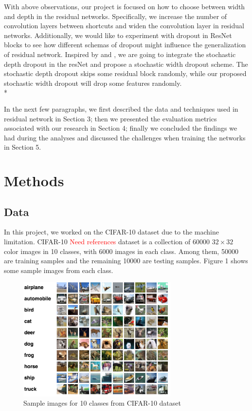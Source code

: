 \documentclass{article} %
\begin{document}
With above observations, our project is focused on how to choose between width and depth in the residual networks. Specifically, we increase the number of convolution layers between shortcuts and widen the convolution layer in residual networks. Additionally, we would like to experiment with dropout in ResNet blocks to see how different schemas of dropout might influence the generalization of residual network. Inspired by \cite{he2016identity} and \cite{DBLP:journals/corr/HuangSLSW16}, we are going to integrate the stochastic depth dropout in the resNet and propose a stochastic width dropout scheme. The stochastic depth dropout skips some residual block randomly, while our proposed stochastic width dropout will drop some features randomly. \\*

In the next few paragraphs, we first described the data and techniques used in residual network in Section 3; then we presented the evaluation metrics associated with our research in Section 4; finally we concluded the findings we had during the analyses and discussed the challenges when training the networks in Section 5.

\section{Methods}

\subsection{Data}

In this project, we worked on the CIFAR-10 dataset due to the machine limitation. CIFAR-10 \textcolor{red}{Need references} dataset is a collection of 60000 $32\times 32$ color images in 10 classes, with 6000 images in each class. Among them, 50000 are training samples and the remaining 10000 are testing samples. Figure 1 shows some sample images from each class. 
\begin{figure}[h]
\centering
\includegraphics[width=8cm]{cifar10}
 \caption{Sample images for 10 classes from CIFAR-10 dataset}
\end{figure}
\end{document}
